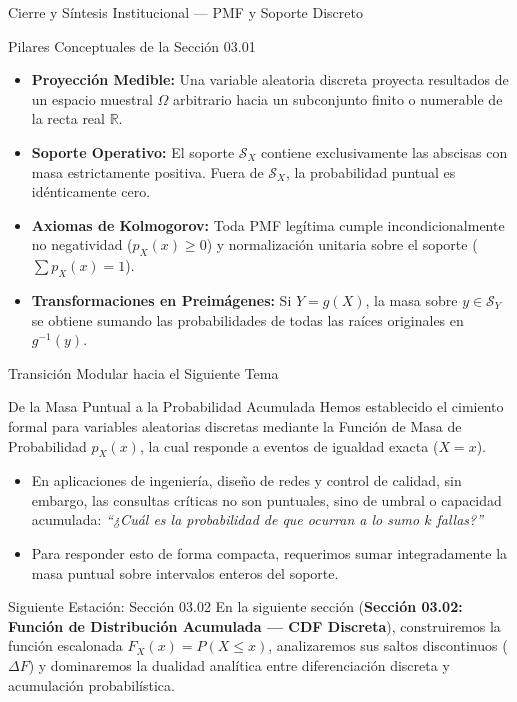\documentclass[10pt, aspectratio=169]{beamer}
\begin{document}
\begin{frame}{Cierre y Síntesis Institucional — PMF y Soporte Discreto}
  \fontsize{7.5pt}{9pt}\selectfont
  \begin{block}{Pilares Conceptuales de la Sección 03.01}
    \fontsize{7.5pt}{9pt}\selectfont
    \begin{itemize}\itemsep=0.12cm
      \item \textbf{Proyección Medible:} Una variable aleatoria discreta proyecta resultados de un espacio muestral $\Omega$ arbitrario hacia un subconjunto finito o numerable de la recta real $\mathbb{R}$.
      \item \textbf{Soporte Operativo:} El soporte $\mathcal{S}_X$ contiene exclusivamente las abscisas con masa estrictamente positiva. Fuera de $\mathcal{S}_X$, la probabilidad puntual es idénticamente cero.
      \item \textbf{Axiomas de Kolmogorov:} Toda PMF legítima cumple incondicionalmente no negatividad ($p_X(x) \ge 0$) y normalización unitaria sobre el soporte ($\sum p_X(x) = 1$).
      \item \textbf{Transformaciones en Preimágenes:} Si $Y=g(X)$, la masa sobre $y \in \mathcal{S}_Y$ se obtiene sumando las probabilidades de todas las raíces originales en $g^{-1}(y)$.
    \end{itemize}
  \end{block}
\end{frame}

\begin{frame}{Transición Modular hacia el Siguiente Tema}
  \fontsize{7.5pt}{9pt}\selectfont
  \begin{block}{De la Masa Puntual a la Probabilidad Acumulada}
    \fontsize{7.5pt}{9pt}\selectfont
    Hemos establecido el cimiento formal para variables aleatorias discretas mediante la Función de Masa de Probabilidad $p_X(x)$, la cual responde a eventos de igualdad exacta ($X=x$).
    \begin{itemize}\itemsep=0.12cm
      \item En aplicaciones de ingeniería, diseño de redes y control de calidad, sin embargo, las consultas críticas no son puntuales, sino de umbral o capacidad acumulada: \emph{``¿Cuál es la probabilidad de que ocurran a lo sumo $k$ fallas?''}
      \item Para responder esto de forma compacta, requerimos sumar integradamente la masa puntual sobre intervalos enteros del soporte.
    \end{itemize}
  \end{block}
  \vspace{-0.15cm}
  \pause
  \begin{alertblock}{Siguiente Estación: Sección 03.02}
    \fontsize{7.5pt}{9pt}\selectfont
    En la siguiente sección (\textbf{Sección 03.02: Función de Distribución Acumulada — CDF Discreta}), construiremos la función escalonada $F_X(x) = P(X \le x)$, analizaremos sus saltos discontinuos ($\Delta F$) y dominaremos la dualidad analítica entre diferenciación discreta y acumulación probabilística.
  \end{alertblock}
\end{frame}
\end{document}
